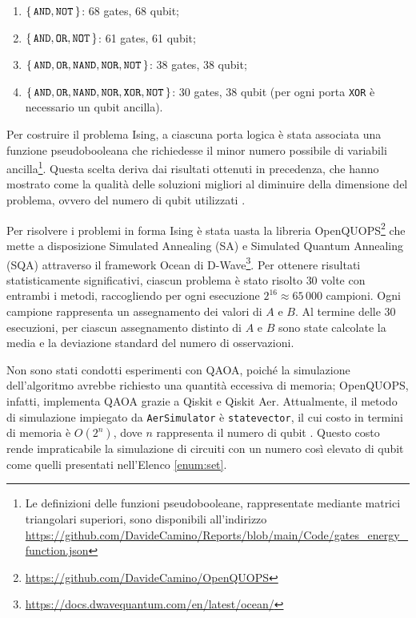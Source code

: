 \documentclass[]{article}
\begin{document}
	\begin{enumerate}
		\label{enum:set}
		\item $\set{\texttt{AND}, \texttt{NOT}}$: 68 gates, 68 qubit;
		\item $\set{\texttt{AND}, \texttt{OR}, \texttt{NOT}}$: 61 gates, 61 qubit;
		\item $\set{\texttt{AND}, \texttt{OR}, \texttt{NAND}, \texttt{NOR}, \texttt{NOT}}$: 38 gates, 38 qubit;
		\item $\set{\texttt{AND}, \texttt{OR}, \texttt{NAND}, \texttt{NOR}, \texttt{XOR}, \texttt{NOT}}$: 30 gates, 38 qubit (per ogni porta \texttt{XOR} è necessario un qubit ancilla).
	\end{enumerate}
	
	Per costruire il problema Ising, a ciascuna porta logica è stata associata una funzione pseudobooleana che richiedesse il minor numero possibile di variabili ancilla\footnote{Le definizioni delle funzioni pseudobooleane, rappresentate mediante matrici triangolari superiori, sono disponibili all'indirizzo \url{https://github.com/DavideCamino/Reports/blob/main/Code/gates_energy_function.json}}. Questa scelta deriva dai risultati ottenuti in precedenza, che hanno mostrato come la qualità delle soluzioni migliori al diminuire della dimensione del problema, ovvero del numero di qubit utilizzati \cite{Camino_Sperimentando}.
	
	Per risolvere i problemi in forma Ising è stata uasta la libreria OpenQUOPS\footnote{\url{https://github.com/DavideCamino/OpenQUOPS}} che mette a disposizione Simulated Annealing (SA) e Simulated Quantum Annealing (SQA) attraverso il framework Ocean di D-Wave\footnote{\url{https://docs.dwavequantum.com/en/latest/ocean/}}. Per ottenere risultati statisticamente significativi, ciascun problema è stato risolto $30$ volte con entrambi i metodi, raccogliendo per ogni esecuzione $2^{16} \approx 65\,000$ campioni. Ogni campione rappresenta un assegnamento dei valori di $A$ e $B$. Al termine delle $30$ esecuzioni, per ciascun assegnamento distinto di $A$ e $B$ sono state calcolate la media e la deviazione standard del numero di osservazioni.
	
	Non sono stati condotti esperimenti con QAOA, poiché la simulazione dell'algoritmo avrebbe richiesto una quantità eccessiva di memoria; OpenQUOPS, infatti, implementa QAOA grazie a Qiskit e Qiskit Aer. Attualmente, il metodo di simulazione impiegato da \texttt{AerSimulator} è \texttt{statevector}, il cui costo in termini di memoria è $O(2^n)$, dove $n$ rappresenta il numero di qubit \cite{qiskit_aer_aersimulator}. Questo costo rende impraticabile la simulazione di circuiti con un numero così elevato di qubit come quelli presentati nell'Elenco \ref{enum:set}.
	
\end{document}
